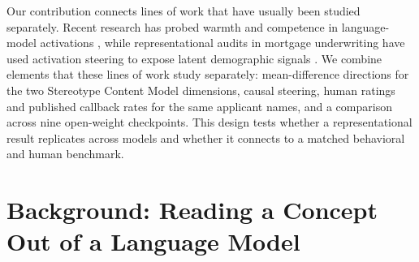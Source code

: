 \documentclass[twocolumn]{article}
\begin{document}
Our contribution connects lines of work that have usually been studied
separately. Recent research has probed warmth and competence in
language-model activations
\citep{deas2025artificial}, while representational audits in mortgage
underwriting have used activation steering to expose latent demographic
signals \citep{tripathy2026fair}. We combine elements that these lines of
work study separately: mean-difference directions for the two Stereotype
Content Model dimensions, causal steering, human ratings and published
callback rates for the same applicant names, and a comparison across nine
open-weight checkpoints. This design tests whether a representational result
replicates across models and whether it connects to a matched behavioral and
human benchmark.

\section*{Background: Reading a Concept Out of a Language Model}
\end{document}
